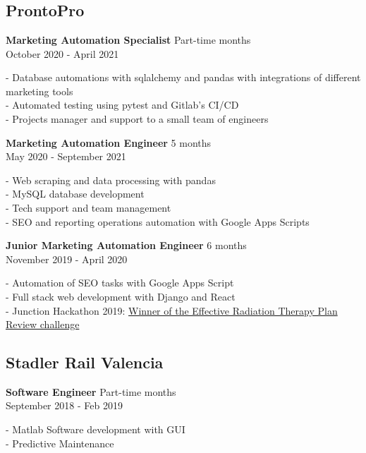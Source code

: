 \section*{\faBriefcase} \label{sec:experience}
 {}

\subsection{ProntoPro}
\textbf{Marketing Automation Specialist} \hfill Part-time  months \\ 
{\footnotesize October 2020 - April 2021} \\
{
    \raggedright
    - Database automations with sqlalchemy and pandas with
    integrations of different marketing tools \\
    - Automated testing using pytest and Gitlab's CI/CD \\
    - Projects manager and support to a small team of engineers \\
}

\textbf{Marketing Automation Engineer} \hfill 5 months \\ 
{\footnotesize May 2020 - September 2021} \\
{
    \raggedright
    - Web scraping and data processing with pandas \\
    - MySQL database development \\
    - Tech support and team management \\
    - SEO and reporting operations automation with Google Apps Scripts \\
}

\textbf{Junior Marketing Automation Engineer} \hfill 6 months \\ 
{\footnotesize November 2019 - April 2020} \\
{
    \raggedright
    - Automation of SEO tasks with Google Apps Script \\
    - Full stack web development with Django and React \\
    - Junction Hackathon 2019:
    \href{http://www.upv.es/noticias-upv/noticia-11673-makers-upv-tri-es.html}{Winner
    of the Effective Radiation Therapy Plan Review challenge}\\
}

\medskip
\subsection{Stadler Rail Valencia}
\textbf{Software Engineer} \hfill Part-time  months \\ 
{\footnotesize September 2018 - Feb 2019} \\
{
    \raggedright
    - Matlab Software development with GUI \\
    - Predictive Maintenance \\
}